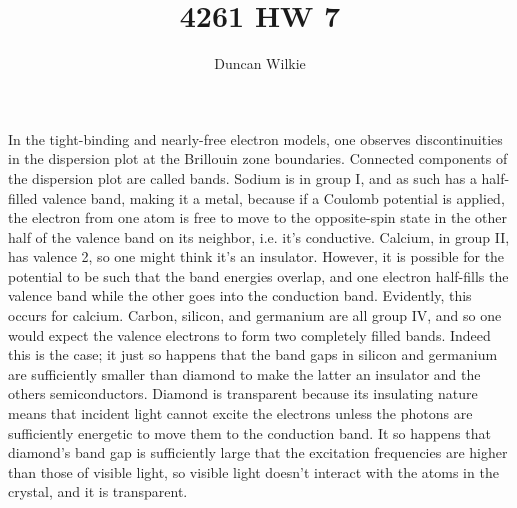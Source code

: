 \documentclass{article}
\title{4261 HW 7}
\author{Duncan Wilkie}
\date{}
\begin{document}
\maketitle

\section{}
In the tight-binding and nearly-free electron models, one observes discontinuities in the dispersion plot at the Brillouin zone boundaries.
Connected components of the dispersion plot are called bands.
Sodium is in group I, and as such has a half-filled valence band, making it a metal, because if a Coulomb potential is applied, the electron
from one atom is free to move to the opposite-spin state in the other half of the valence band on its neighbor, i.e. it's conductive.
Calcium, in group II, has valence 2, so one might think it's an insulator.
However, it is possible for the potential to be such that the band energies overlap, and one electron half-fills the valence band
while the other goes into the conduction band.
Evidently, this occurs for calcium.
Carbon, silicon, and germanium are all group IV, and so one would expect the valence electrons to form two completely filled bands.
Indeed this is the case; it just so happens that the band gaps in silicon and germanium are sufficiently smaller than diamond to make
the latter an insulator and the others semiconductors.
Diamond is transparent because its insulating nature means that incident light cannot excite the electrons unless the photons are
sufficiently energetic to move them to the conduction band.
It so happens that diamond's band gap is sufficiently large that the excitation frequencies are higher than those of visible light, so
visible light doesn't interact with the atoms in the crystal, and it is transparent.
\end{document}
